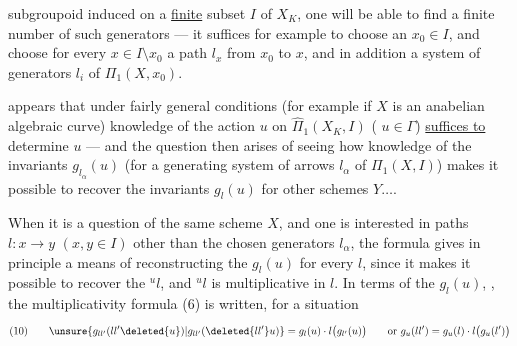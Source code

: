 subgroupoid induced on a \uline{finite} subset  $I$ of $X_K$, one will be able to find a finite number of such generators --- it suffices for example to choose an  $x_0\in I$, and choose for every $x\in I\setminus x_0$ a path $l_x$ from $x_0$ to $x$, and in addition a  system of generators $l_i$ of $\Pi_1(X,x_0)$.

 appears that under fairly general conditions (for example if $X$ is an anabelian algebraic curve) knowledge of the action $u$ on $\widehat{\Pi}_1(X_K,I)$ ( $u\in\Gamma$) \uline{suffices to} determine $u$ --- and the question then arises of seeing how knowledge of the invariants  $g_{l_\alpha}(u)$ (for a generating system of arrows $l_\alpha$ of $\Pi_1(X,I)$) makes it possible to recover the invariants $g_l(u)$ for other schemes $Y\ldots$.

When it is a question of the same scheme $X$, and one is interested in paths $l:x\longrightarrow y$ $(x,y\in I)$ other than the chosen generators $l_\alpha$, the formula gives in principle a means of reconstructing the $g_l(u)$ for every $l$, since it makes it possible to recover the ${}^u l$, and ${}^u l$ is multiplicative in $l$. In terms of the $g_l(u)$, , the multiplicativity formula (6) is written, for a situation
\[
(10)\qquad \unsure{g_{ll'}(ll'\deleted{u})|g_{ll'}(\deleted{ll'}u)}=g_l(u)\cdot l\bigl(g_{l'}(u)\bigr)
\qquad\text{or }g_u(ll')=g_u(l)\cdot l\bigl(g_u(l')\bigr)
\]
